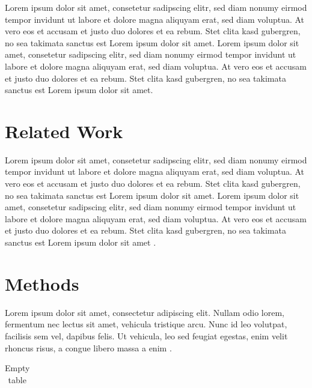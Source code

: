\documentclass[11pt,a4paper,twoside,openright]{report}
\begin{document}
Lorem ipsum dolor sit amet, consetetur sadipscing elitr, sed diam nonumy
eirmod tempor invidunt ut labore et dolore magna aliquyam erat, sed diam voluptua. At
vero eos et accusam et justo duo dolores et ea rebum. Stet clita kasd gubergren, no sea
takimata sanctus est Lorem ipsum dolor sit amet. Lorem ipsum dolor sit amet, consetetur
sadipscing elitr, sed diam nonumy eirmod tempor invidunt ut labore et dolore magna
aliquyam erat, sed diam voluptua. At vero eos et accusam et justo duo dolores et ea
rebum. Stet clita kasd gubergren, no sea takimata sanctus est Lorem ipsum dolor sit amet.

\chapter{Related Work}
\label{sec:related}

Lorem ipsum dolor sit amet, consetetur sadipscing elitr, sed diam nonumy
eirmod tempor invidunt ut labore et dolore magna aliquyam erat, sed diam voluptua. At
vero eos et accusam et justo duo dolores et ea rebum. Stet clita kasd gubergren, no sea
takimata sanctus est Lorem ipsum dolor sit amet. Lorem ipsum dolor sit amet, consetetur
sadipscing elitr, sed diam nonumy eirmod tempor invidunt ut labore et dolore magna
aliquyam erat, sed diam voluptua. At vero eos et accusam et justo duo dolores et ea
rebum. Stet clita kasd gubergren, no sea takimata sanctus est Lorem ipsum dolor sit amet \cite{Kamal:2007:PCT:1321261.1321264, Vitanen:2012, Olsen:2004, Musgrave:1989:SRE:74333.74337, mei:inria-00402079}.


\chapter{Methods}
\label{sec:methods}

Lorem ipsum dolor sit amet, consectetur adipiscing elit. Nullam odio lorem, fermentum nec lectus sit amet, vehicula tristique arcu. Nunc id leo volutpat, facilisis sem vel, dapibus felis. Ut vehicula, leo sed feugiat egestas, enim velit rhoncus risus, a congue libero massa a enim \cite{seiler:2013,shirley:2009}.

\begin{table}
\caption{Empty table}
\begin{tabular}{|ccc|}

\end{tabular}
\end{table}
\end{document}

